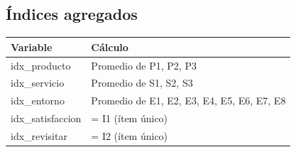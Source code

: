 \documentclass[
  spanish,
]{article}
\begin{document}
\subsection{Índices agregados}\label{uxedndices-agregados}

\begin{longtable}[t]{ll}
\toprule
Variable & Cálculo\\
\midrule
idx\_producto & Promedio de P1, P2, P3\\
idx\_servicio & Promedio de S1, S2, S3\\
idx\_entorno & Promedio de E1, E2, E3, E4, E5, E6, E7, E8\\
idx\_satisfaccion & = I1 (ítem único)\\
idx\_revisitar & = I2 (ítem único)\\
\bottomrule
\end{longtable}
\end{document}
